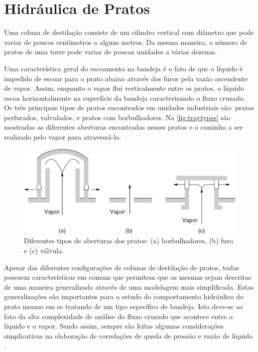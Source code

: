 \section{Hidráulica de Pratos}\label{sec:hydraulics}
Uma coluna de destilação consiste de um cilindro vertical com diâmetro que pode variar de poucos centímetros
a alguns metros. Da mesma maneira, o número de pratos de uma torre pode variar de poucas unidades  a
várias dezenas.

Uma característica geral do escoamento na bandeja é o fato de que o líquido é impedido de escoar para
o prato abaixo através dos furos pela vazão ascendente de vapor. Assim, enquanto o vapor flui verticalmente
entre os pratos, o líquido escoa horizontalmente na superfície da bandeja caracterizando o fluxo cruzado.
Os três principais tipos de pratos encontrados em unidades industriais são:
pratos perfurados, valvulados, e pratos com borbulhadores. Na
\autoref{fig:traytypes} são mostradas as diferentes aberturas encontradas nesses pratos e o caminho a ser realizado pelo vapor para atravessá-lo.
\begin{figure}[htb]
\centering \includegraphics[scale=0.5]{images/Chap3/traytype.png}
\caption{Diferentes tipos de aberturas dos pratos: (a) borbulhadores, (b)
furo e (c) válvula.}
\label{fig:traytypes}
\end{figure}

Apesar das diferentes configurações de colunas de destilação de pratos, todas possuem
características em comum que permitem que as mesmas sejam descritas de uma maneira generalizada através
de uma modelagem mais simplificada. Estas generalizações são importantes para o estudo do comportamento
hidráulico do prato mesmo em se tratando de um tipo específico de bandeja. Isto deve-se ao fato da alta
complexidade de análise do fluxo cruzado que acontece entre o líquido e o vapor. Sendo assim,
sempre são feitas algumas considerações simplicativas na elaboração de correlações de queda de pressão
e vazão de líquido \cite{Khoury:2005}.

